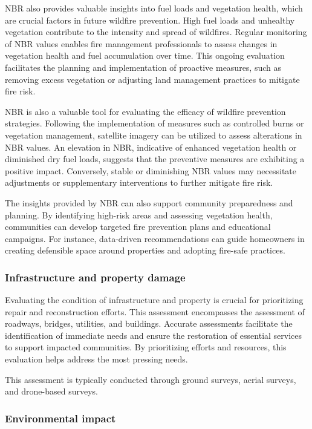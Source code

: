 \documentclass[
  12 pt,
]{Nemilov}
\begin{document}
NBR also provides valuable insights into fuel loads and vegetation health, which are crucial factors in future wildfire prevention. High fuel loads and unhealthy vegetation contribute to the intensity and spread of wildfires. Regular monitoring of NBR values enables fire management professionals to assess changes in vegetation health and fuel accumulation over time. This ongoing evaluation facilitates the planning and implementation of proactive measures, such as removing excess vegetation or adjusting land management practices to mitigate fire risk.

NBR is also a valuable tool for evaluating the efficacy of wildfire prevention strategies. Following the implementation of measures such as controlled burns or vegetation management, satellite imagery can be utilized to assess alterations in NBR values. An elevation in NBR, indicative of enhanced vegetation health or diminished dry fuel loads, suggests that the preventive measures are exhibiting a positive impact. Conversely, stable or diminishing NBR values may necessitate adjustments or supplementary interventions to further mitigate fire risk.

The insights provided by NBR can also support community preparedness and planning. By identifying high-risk areas and assessing vegetation health, communities can develop targeted fire prevention plans and educational campaigns. For instance, data-driven recommendations can guide homeowners in creating defensible space around properties and adopting fire-safe practices.

\subsubsection{Infrastructure and property damage}\label{infrastructure-and-property-damage}

Evaluating the condition of infrastructure and property is crucial for prioritizing repair and reconstruction efforts. This assessment encompasses the assessment of roadways, bridges, utilities, and buildings. Accurate assessments facilitate the identification of immediate needs and ensure the restoration of essential services to support impacted communities. By prioritizing efforts and resources, this evaluation helps address the most pressing needs.

This assessment is typically conducted through ground surveys, aerial surveys, and drone-based surveys.

\subsubsection{Environmental impact}\label{environmental-impact}
\end{document}
